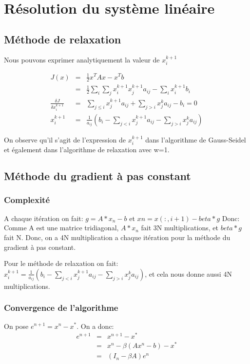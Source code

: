 \documentclass[a4paper,11pt]{article}
\begin{document}
\titleTMB 
\newpage
\tableofcontents
\listoffigures
\newpage

\section{Résolution du système linéaire}

\subsection{Méthode de relaxation}
Nous pouvons exprimer analytiquement la valeur de $x_i^{k+1}$

\begin{eqnarray*}
  J(x) 	&=& \frac{1}{2} x^TAx - x^Tb\\
        &=& \frac{1}{2} \sum_{i}\sum_{j} x_i^{k+1}x_j^{k+1}a_{ij} - \sum_{i} x_i^{k+1}b_i\\
\frac{\delta J}{\delta x_i^{k+1}} &=& \sum_{j\leq i} x_j^{k+1}a_{ij} + \sum_{j>i} x_j^{k} a_{ij} - b_i = 0\\
x_i^{k+1} &=& \frac{1}{a_{ij}} (b_i - \sum_{j<i} x_j^{k+1}a_{ij} - \sum_{j>i} x_j^{k} a_{ij})
\end{eqnarray*}

On  observe  qu'il  s'agit  de l'expression  de  $x_i^{k+1}$  dans
l'algorithme de  Gauss-Seidel et également  dans l'algorithme de
relaxation avec w=1.

\subsection{Méthode du gradient à pas constant}

\subsubsection{Complexité}
A chaque itération on fait:
$ g = A*x_n-b$ et $   xn = x(:,i+1)-beta*g$
Donc: Comme A est une matrice tridiagonal, $A*x_n$ fait 3N multiplications, et 
$beta*g$ fait N. Donc, on a 4N multiplication a chaque itération pour la méthode
du gradient à pas constant.


Pour  le méthode  de relaxation  on  fait:$x_i^{k+1} =  \frac{1}{a_{ij}} (b_i  -
\sum_{j<i}  x_j^{k+1}a_{ij} - \sum_{j>i}  x_j^{k} a_{ij})$,  et cela  nous donne
aussi 4N multiplications.


\subsubsection{Convergence de l'algorithme}
On pose $e^{n+1}=x^{n} - x^{*}$. On a donc:
\begin{eqnarray*}
  e^{n+1} &=& x^{n+1}-x^{*}\\ 
  &=& x^{n}-\beta(Ax^{n}-b) - x^{*}\\
  &=& (I_n-\beta A) e^{n}
\end{eqnarray*}
\end{document}

